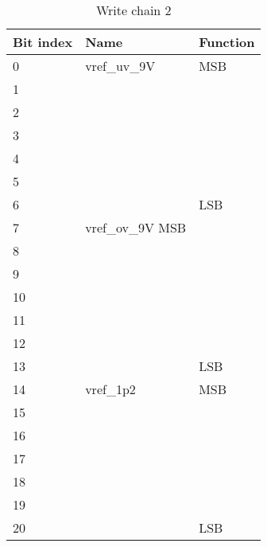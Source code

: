 \begin{table}[!htbp]
\centering
\begin{tabular}{@{}lll@{}}
\toprule
Bit index & Name & Function \\ \toprule
0 &	vref\_uv\_9V	 & MSB \\
1 & & \\
2 & & \\
3 & & \\
4 & & \\
5 & & \\
6	&	& LSB \\
7	& vref\_ov\_9V MSB \\
8  & & \\
9  & & \\
10 & & \\
11 & & \\
12 & & \\
13 & & LSB \\
14 & vref\_1p2 &	MSB \\
15 & & \\
16 & & \\
17 & & \\
18 & & \\
19 & & \\
20 & & LSB \\
\bottomrule
\end{tabular}
\caption{Write chain 2}
\label{tab:write-chain-2}
\end{table}

